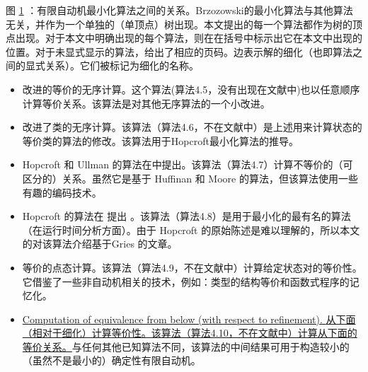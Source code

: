 \begin{figure}[tbp]
{
    }
    \caption{}
    \label{fig:1}
\end{figure}
图 \ref{fig:1} ：有限自动机最小化算法之间的关系。Brzozowski的最小化算法与其他算法无关，并作为一个单独的（单顶点）树出现。本文提出的每一个算法都作为树的顶点出现。对于本文中明确出现的每个算法，则在在括号中标示出它在本文中出现的位置。对于未显式显示的算法，给出了相应的页码。边表示解的细化（也即算法之间的显式关系）。它们被标记为细化的名称。

\begin{itemize}

    \item 改进的等价的无序计算。这个算法(算法4.5，没有出现在文献中)也以任意顺序计算等价关系。该算法是对其他无序算法的一个小改进。

    \item 改进了类的无序计算。该算法（算法4.6，不在文献中）是上述用来计算状态的等价类的算法的修改。该算法用于Hopcroft最小化算法的推导。

    \item Hopcroft 和 Ullman 的算法在\cite{Hu79}中提出。该算法（算法4.7）计算不等价的（可区分的）关系。虽然它是基于 Huffinan \cite{Huff54}和 Moore \cite{Moor56} 的算法，但该算法使用一些有趣的编码技术。

    \item Hopcroft 的算法在 \cite{Hopc71, Grie73} 提出 。该算法（算法4.8）是用于最小化的最有名的算法（在运行时间分析方面）。由于 Hopcroft 的原始陈述是难以理解的，所以本文的对该算法介绍基于Gries 的文章。

    \item 等价的点态计算。该算法（算法4.9，不在文献中）计算给定状态对的等价性。它借鉴了一些非自动机相关的技术，例如：类型的结构等价和函数式程序的记忆化。

    \item \uline{Computation of equivalence from below (with respect to refinement). }
    \uline{从下面（相对于细化）计算等价性。该算法（算法4.10，不在文献中）计算从下面的等价关系。}与任何其他已知算法不同，该算法的中间结果可用于构造较小的（虽然不是最小的）确定性有限自动机。

\end{itemize}